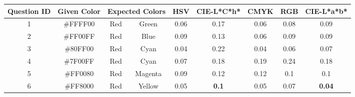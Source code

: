 \begin{table}[!htbp]
  \resizebox{\textwidth}{!} {
  \begin{tabular}{@{}ccccccccc@{}}
    \toprule
    Question ID              & Given Color                                           & \multicolumn{2}{c}{Expected Colors}                         & HSV                                & CIE-L*C*h*                        & CMYK                               & RGB                                & CIE-L*a*b*                         \\ \midrule
    \multicolumn{1}{|c|}{1}  & \multicolumn{1}{c|}{\cellcolor[HTML]{FFFF00}\#FFFF00} & \multicolumn{1}{c|}{Red}     & \multicolumn{1}{c||}{Green}   & \multicolumn{1}{c|}{0.06}          & \multicolumn{1}{c|}{0.17}         & \multicolumn{1}{c|}{0.06}          & \multicolumn{1}{c|}{0.08}          & \multicolumn{1}{c|}{0.09}          \\ \midrule
    \multicolumn{1}{|c|}{2}  & \multicolumn{1}{c|}{\cellcolor[HTML]{FF00FF}\#FF00FF} & \multicolumn{1}{c|}{Red}     & \multicolumn{1}{c||}{Blue}    & \multicolumn{1}{c|}{0.09}          & \multicolumn{1}{c|}{0.13}         & \multicolumn{1}{c|}{0.06}          & \multicolumn{1}{c|}{0.09}          & \multicolumn{1}{c|}{0.09}          \\ \midrule
    \multicolumn{1}{|c|}{3}  & \multicolumn{1}{c|}{\cellcolor[HTML]{80FF00}\#80FF00} & \multicolumn{1}{c|}{Red}     & \multicolumn{1}{c||}{Cyan}    & \multicolumn{1}{c|}{0.04}          & \multicolumn{1}{c|}{0.22}         & \multicolumn{1}{c|}{0.04}          & \multicolumn{1}{c|}{0.06}          & \multicolumn{1}{c|}{0.07}          \\ \midrule
    \multicolumn{1}{|c|}{4}  & \multicolumn{1}{c|}{\cellcolor[HTML]{7F00FF}\#7F00FF} & \multicolumn{1}{c|}{Red}     & \multicolumn{1}{c||}{Cyan}    & \multicolumn{1}{c|}{0.07}          & \multicolumn{1}{c|}{0.18}         & \multicolumn{1}{c|}{0.19}          & \multicolumn{1}{c|}{0.24}          & \multicolumn{1}{c|}{0.18}          \\ \midrule
    \multicolumn{1}{|c|}{5}  & \multicolumn{1}{c|}{\cellcolor[HTML]{FF0080}\#FF0080} & \multicolumn{1}{c|}{Red}     & \multicolumn{1}{c||}{Magenta} & \multicolumn{1}{c|}{0.09}          & \multicolumn{1}{c|}{0.12}         & \multicolumn{1}{c|}{0.12}          & \multicolumn{1}{c|}{0.1}           & \multicolumn{1}{c|}{0.1}           \\ \midrule
    \multicolumn{1}{|c|}{6}  & \multicolumn{1}{c|}{\cellcolor[HTML]{FF8000}\#FF8000} & \multicolumn{1}{c|}{Red}     & \multicolumn{1}{c||}{Yellow}  & \multicolumn{1}{c|}{0.05}          & \multicolumn{1}{c|}{\textbf{0.1}} & \multicolumn{1}{c|}{0.05}          & \multicolumn{1}{c|}{0.07}          & \multicolumn{1}{c|}{\textbf{0.04}} \\ \midrule

\end{tabular}}
\end{table}
